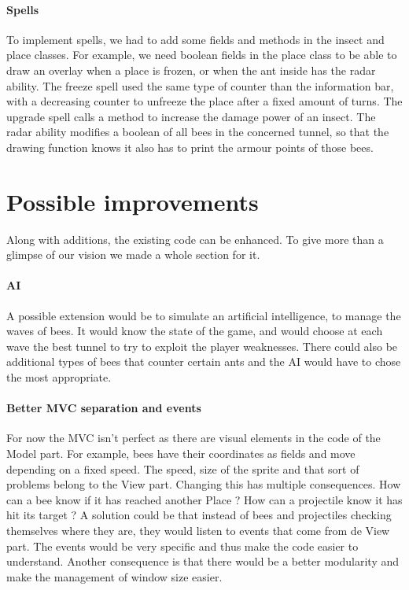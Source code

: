 \documentclass[
	a4paper
]{article}
\begin{document}
\paragraph{Spells} To implement spells, we had to add some fields and methods in the insect and place classes. %
For example, we need boolean fields in the place class to be able to draw an overlay when a place is frozen, or when the ant inside has the radar ability. %
The freeze spell used the same type of counter than the information bar, with a decreasing counter to unfreeze the place after a fixed amount of turns. %
The upgrade spell calls a method to increase the damage power of an insect. %
The radar ability modifies a boolean of all bees in the concerned tunnel, so that the drawing function knows it also has to print the armour points of those bees.


\section{Possible improvements} %

Along with additions, the existing code can be enhanced. %
To give more than a glimpse of our vision we made a whole section for it.


\paragraph{AI} A possible extension would be to simulate an artificial intelligence, to manage the waves of bees. %
It would know the state of the game, and would choose at each wave the best tunnel to try to exploit the player weaknesses. %
There could also be additional types of bees that counter certain ants and the AI would have to chose the most appropriate.

\paragraph{Better MVC separation and events} For now the MVC isn't perfect as there are visual elements in the code of the Model part. %
For example, bees have their coordinates as fields and move depending on a fixed speed. %
The speed, size of the sprite and that sort of problems belong to the View part. %
Changing this has multiple consequences. How can a bee know if it has reached another Place ? %
How can a projectile know it has hit its target ? %
A solution could be that instead of bees and projectiles checking themselves where they are, they would listen to events that come from de View part. %
The events would be very specific and thus make the code easier to understand. %
Another consequence is that there would be a better modularity and make the management of window size easier.
\end{document}
